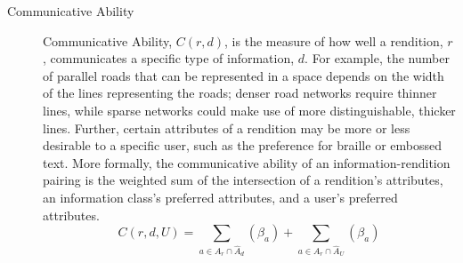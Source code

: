 \begin{description}
\item[Communicative Ability]
Communicative Ability, $C(r,d)$, is the measure of how well a rendition, $r$, communicates a specific type of information, $d$.
For example, the number of parallel roads that can be represented in a space depends on the width of the lines representing the roads; denser road networks require thinner lines, while sparse networks could make use of more distinguishable, thicker lines. Further, certain attributes of a rendition may be more or less desirable to a specific user, such as the preference for braille or embossed text. 
More formally, the communicative ability of an information-rendition pairing is the weighted sum of the intersection of a rendition's attributes, an information class's preferred attributes, and a user's preferred attributes. 
\begin{equation}
\label{eq::communicability}
C(r,d,U) = \sum_{a\in A_r \cap \hat{A}_d}(\beta_a) +  \sum _{a\in A_r \cap \hat{A}_U}(\beta_a)
\end{equation}


\end{description}
